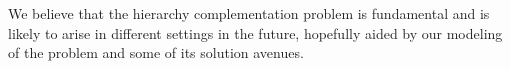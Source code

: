 We believe that the hierarchy complementation problem is fundamental
and is likely to arise in different settings in the future, hopefully
aided by our modeling of the problem and some of its solution avenues.








